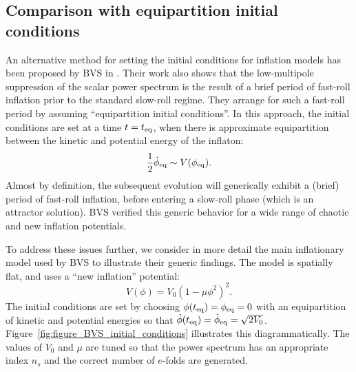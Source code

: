\subsection{Comparison with equipartition initial conditions}
\label{sec:comparison}

An alternative method for setting the initial conditions for inflation models has been proposed by BVS in \citep{boyanovsky_cmb_2006}. Their work also shows that the low-multipole suppression of the scalar power spectrum is the result of a brief period of fast-roll inflation prior to the standard slow-roll regime. They arrange for such a fast-roll period by assuming ``equipartition initial conditions''. In this approach, the initial conditions are set at a time $t=t_{\mathrm{eq}}$, when there is approximate equipartition between the kinetic and potential energy of the inflaton:
%
\begin{equation}
  \frac{1}{2}\dot{\phi}_{\mathrm{eq}} \sim V(\phi_{\mathrm{eq}}).
  \label{eqn:bvsbc}
\end{equation}
%
Almost by definition, the subsequent evolution will generically exhibit a (brief) period of fast-roll inflation, before entering a slow-roll phase (which is an attractor solution). BVS verified this generic behavior for a wide range of chaotic and new inflation potentials.

To address these issues further, we consider in more detail the main inflationary model used by BVS to illustrate their generic findings.  The model is spatially flat, and uses a ``new inflation'' potential:
%
\begin{equation}
  V(\phi) =V_0{\left(1-\mu\phi^2\right)}^2.
\end{equation}
%
The initial conditions are set by choosing $\phi(t_{\mathrm{eq}})=\phi_{\mathrm{eq}}=0$ with an equipartition of kinetic and potential energies so that $\dot{\phi}(t_{\mathrm{eq}})=\dot{\phi}_{\mathrm{eq}}=\sqrt{2V_0}$.  Figure~\ref{fig:figure_BVS_initial_conditions} illustrates this diagrammatically.  The values of $V_0$ and $\mu$ are tuned so that the power spectrum has an appropriate index $n_s$ and the correct number of $e$-folds are generated.


